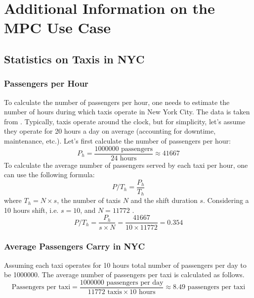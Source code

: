 \chapter{Additional Information on the MPC Use Case }
\section{Statistics on Taxis in NYC}\label{appendix:sec:stats_nyc_taxis}
\subsection{Passengers per Hour}
To calculate the number of passengers per hour, one needs to estimate the number of hours during which taxis operate in New York City. The data is taken from \cite{nyc_taxi_history}. Typically, taxis operate around the clock, but for simplicity, let's assume they operate for 20 hours a day on average (accounting for downtime, maintenance, etc.). Let's first calculate the number of passengers per hour:
\[ P_{h} = \frac{1000000 \text{ passengers}}{24 \text{ hours}}\approx 41667 \]
To calculate the average number of passengers served by each taxi per hour, one can use the following formula:
\[ P/T_h = \frac{P_{h}}{T_h} \]
where $T_h = N \times s$, the number of taxis $N$ and the shift duration $s$.
Considering a 10 hours shift, i.e. $s=10$, and $N =11772$ .
\[ P/T_h = \frac{P_h}{s\times N} = \frac{ 41667}{10\times 11772} =  0.354\]
\subsection{Average Passengers Carry in NYC}
Assuming each taxi operates for 10 hours total number of passengers per day to be 1000000. The average number of passengers per taxi is calculated as follows.
\[ \text{Passengers per taxi} = \frac{1000000 \text{ passengers per day}}{11772 \text{ taxis} \times 10 \text{ hours}} \approx 8.49 \text{ passengers per taxi}\]
